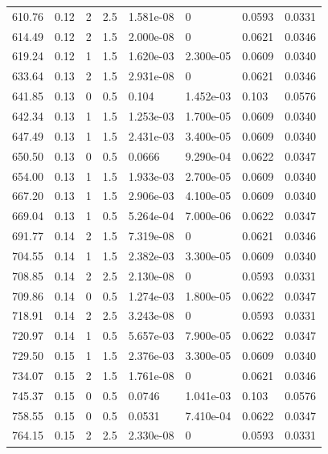 \documentclass[preview]{standalone}
\begin{document}
{{{\begin{tabular}{L{1.2cm}C{1.2cm} C{0.3cm}C{0.5cm} C{1.4cm}C{1.4cm} C{1.4cm}C{1.4cm}}
  610.76  &  0.12  & 2     & 2.5 &  1.581e-08  & 0  & 0.0593 &  0.0331   \\ 
  614.49  &  0.12  & 2     & 1.5 &  2.000e-08  & 0  & 0.0621 &  0.0346   \\ 
  619.24  &  0.12  & 1     & 1.5 &  1.620e-03  & 2.300e-05  & 0.0609 &  0.0340   \\ 
  633.64  &  0.13  & 2     & 1.5 &  2.931e-08  & 0  & 0.0621 &  0.0346   \\ 
  641.85  &  0.13  & 0     & 0.5 &  0.104  & 1.452e-03  & 0.103 &  0.0576   \\ 
  642.34  &  0.13  & 1     & 1.5 &  1.253e-03  & 1.700e-05  & 0.0609 &  0.0340   \\ 
  647.49  &  0.13  & 1     & 1.5 &  2.431e-03  & 3.400e-05  & 0.0609 &  0.0340   \\ 
  650.50  &  0.13  & 0     & 0.5 &  0.0666  & 9.290e-04  & 0.0622 &  0.0347   \\ 
  654.00  &  0.13  & 1     & 1.5 &  1.933e-03  & 2.700e-05  & 0.0609 &  0.0340   \\ 
  667.20  &  0.13  & 1     & 1.5 &  2.906e-03  & 4.100e-05  & 0.0609 &  0.0340   \\ 
  669.04  &  0.13  & 1     & 0.5 &  5.264e-04  & 7.000e-06  & 0.0622 &  0.0347   \\ 
  691.77  &  0.14  & 2     & 1.5 &  7.319e-08  & 0  & 0.0621 &  0.0346   \\ 
  704.55  &  0.14  & 1     & 1.5 &  2.382e-03  & 3.300e-05  & 0.0609 &  0.0340   \\ 
  708.85  &  0.14  & 2     & 2.5 &  2.130e-08  & 0  & 0.0593 &  0.0331   \\ 
  709.86  &  0.14  & 0     & 0.5 &  1.274e-03  & 1.800e-05  & 0.0622 &  0.0347   \\ 
  718.91  &  0.14  & 2     & 2.5 &  3.243e-08  & 0  & 0.0593 &  0.0331   \\ 
  720.97  &  0.14  & 1     & 0.5 &  5.657e-03  & 7.900e-05  & 0.0622 &  0.0347   \\ 
  729.50  &  0.15  & 1     & 1.5 &  2.376e-03  & 3.300e-05  & 0.0609 &  0.0340   \\ 
  734.07  &  0.15  & 2     & 1.5 &  1.761e-08  & 0  & 0.0621 &  0.0346   \\ 
  745.37  &  0.15  & 0     & 0.5 &  0.0746  & 1.041e-03  & 0.103 &  0.0576   \\ 
  758.55  &  0.15  & 0     & 0.5 &  0.0531  & 7.410e-04  & 0.0622 &  0.0347   \\ 
  764.15  &  0.15  & 2     & 2.5 &  2.330e-08  & 0  & 0.0593 &  0.0331   \\ 

\end{tabular}}}}
\end{document}
